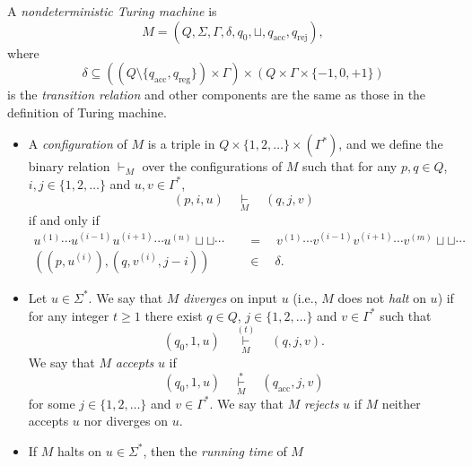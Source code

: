 \begin{definition}
  A \emph{nondeterministic Turing machine} is
  \begin{equation*}
    M = (Q, \Sigma, \Gamma, \delta, q_0, \sqcup, q_\text{acc}, q_\text{rej}),
  \end{equation*}
  where
  \begin{equation*}
    \delta \subseteq ((Q \setminus \{q_\text{acc}, q_\text{reg}\}) \times
    \Gamma) \times (Q \times \Gamma \times \{-1, 0, +1\})
  \end{equation*}
  is the \emph{transition relation} and other components are the same as those
  in the definition of Turing machine.
  \begin{itemize}
    \item A \emph{configuration} of $M$ is a triple in
    $Q \times \{1, 2, \dots\} \times (\Gamma^*)$, and we define the binary
    relation $\vdash_M$ over the configurations of $M$ such that for any
    $p, q \in Q$, $i, j \in \{1, 2, \dots\}$ and $u, v \in \Gamma^*$,
    \begin{equation*}
      (p, i, u)
      \quad \mathop\vdash\limits_{M} \quad
      (q, j, v)
    \end{equation*}
    if and only if
    \begin{align*}
      u^{(1)} \cdots u^{(i-1)}u^{(i+1)} \cdots u^{(n)} \sqcup \sqcup \cdots
      \quad &= \quad
      v^{(1)} \cdots v^{(i-1)}v^{(i+1)} \cdots v^{(m)} \sqcup \sqcup \cdots \\
      ((p, u^{(i)}), (q, v^{(i)}, j - i)) \quad &\in \quad \delta.
    \end{align*}
    \item Let $u \in \Sigma^*$.
    We say that $M$ \emph{diverges} on input $u$
    (i.e., $M$ does not \emph{halt} on $u$) if for any integer $t \geq 1$ there
    exist $q \in Q$, $j \in \{1, 2, \dots\}$ and $v \in \Gamma^*$ such that
    \begin{equation*}
      (q_0, 1, u)
      \quad \mathop\vdash\limits_{M}^{(t)} \quad
      (q, j, v).
    \end{equation*}
    We say that $M$ \emph{accepts} $u$ if
    \begin{equation*}
      (q_0, 1, u)
      \quad \mathop\vdash\limits_{M}^* \quad
      (q_\text{acc}, j, v)
    \end{equation*}
    for some $j \in \{1, 2, \dots\}$ and $v \in \Gamma^*$.
    We say that $M$ \emph{rejects} $u$ if $M$ neither accepts $u$
    nor diverges on $u$.
    \item If $M$ halts on $u \in \Sigma^*$, then the \emph{running time} of $M$

\end{itemize}
\end{definition}
